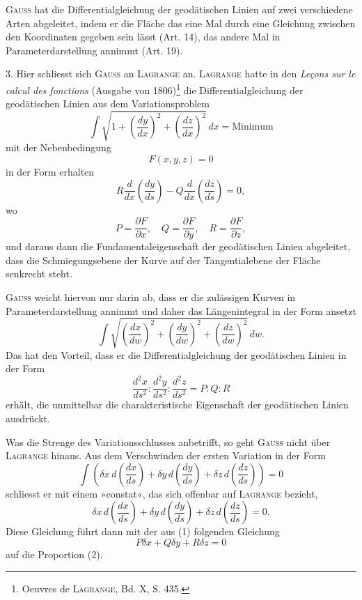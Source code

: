 \textsc{Gauss} hat die Differentialgleichung der geodätischen Linien auf zwei verschiedene
Arten abgeleitet, indem er die Fläche das eine Mal durch eine
Gleichung zwischen den Koordinaten gegeben sein lässt (Art. 14), das andere
Mal in Parameterdarstellung annimmt (Art. 19).
\begin{center}\end{center}
\noindent\hspace*{\parindent}3. Hier schliesst sich \textsc{Gauss} an \textsc{Lagrange} an. \textsc{Lagrange} hatte in den
\textit{Leçons sur le calcul des fonctions} (Ausgabe von 1806)\footnote{Oeuvres de \textsc{Lagrange}, Bd. X, S. 435.} die Differentialgleichung
der geodätischen Linien aus dem Variationsproblem
\[
\int\sqrt{1+\left(\frac{dy}{dx}\right)^2+\left(\frac{dz}{dx}\right)^2}\,dx=\text{Minimum}
\]
\clearpage{}
\noindent mit der Nebenbedingung
\begin{equation*}\tag{1}
F(x,y,z)=0
\end{equation*}
in der Form erhalten
\[
R\frac{d}{dx}\left(\frac{dy}{ds}\right)-Q\frac{d}{dx}\left(\frac{dz}{ds}\right)=0,
\]
wo
\[
P=\frac{\partial F}{\partial x},\quad Q=\frac{\partial F}{\partial y},\quad R=\frac{\partial F}{\partial z},
\]
und daraus dann die Fundamentaleigenschaft der geodätischen Linien abgeleitet,
dass die Schmiegungsebene der Kurve auf der Tangentialebene der
Fläche senkrecht steht.

\textsc{Gauss} weicht hiervon nur darin ab, dass er die zulässigen Kurven in
Parameterdarstellung annimmt und daher das Längenintegral in der Form
ansetzt
\[
\int\sqrt{\left(\frac{dx}{dw}\right)^2+\left(\frac{dy}{dw}\right)^2+\left(\frac{dz}{dw}\right)^2}\,dw.
\]
Das hat den Vorteil, dass er die Differentialgleichung der geodätischen Linien
in der  Form
\begin{equation*}\tag{2}
\frac{d^2x}{ds^2}:\frac{d^2y}{ds^2}:\frac{d^2z}{ds^2}=P:Q:R
\end{equation*}
erhält, die unmittelbar die charakteristische Eigenschaft der geodätischen Linien
ausdrückt.

Was die Strenge des Variationsschlusses anbetrifft, so geht \textsc{Gauss} nicht
über \textsc{Lagrange} hinaus. Aus dem Verschwinden der ersten Variation in der
Form
\[
\int\left(\delta x\,d\left(\frac{dx}{ds}\right)+\delta y\,d\left(\frac{dy}{ds}\right)+\delta z\,d\left(\frac{dz}{ds}\right)\right)=0
\]
schliesst er mit einem »constat«, das sich offenbar auf \textsc{Lagrange} bezieht,
\[
\delta x\,d\left(\frac{dx}{ds}\right)+\delta y\,d\left(\frac{dy}{ds}\right)+\delta z\,d\left(\frac{dz}{ds}\right)=0.
\]
Diese Gleichung führt dann mit der aus (1) folgenden Gleichung
\[
P\delta x+Q\delta y+R\delta z=0
\]
auf die Proportion (2).
\par\clearpage\endgroup
